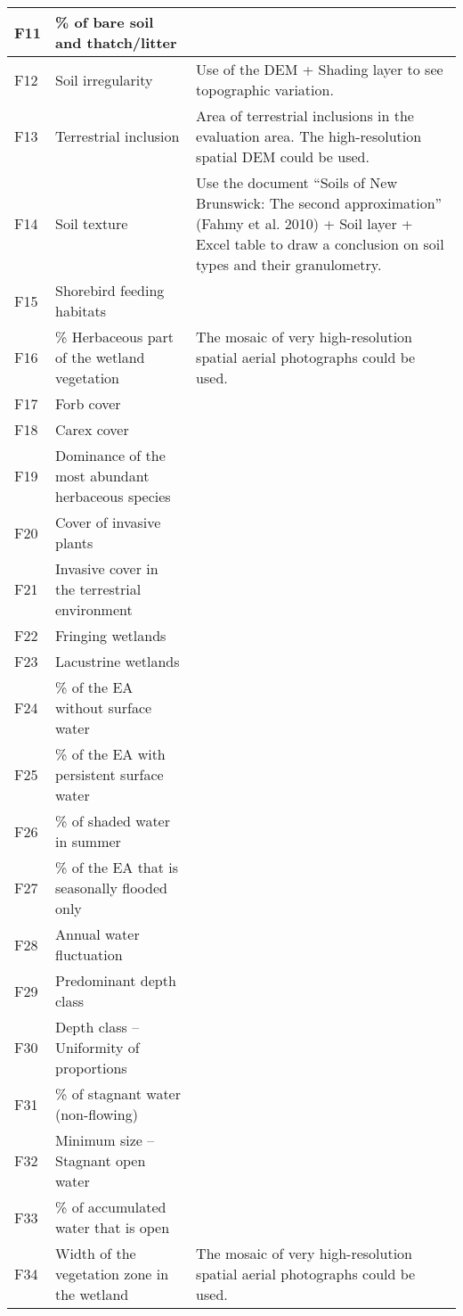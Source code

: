 \begin{longtable}{|l|p{3cm}|p{10cm}|}
    F11 & \% of bare soil and thatch/litter & \\ \hline
    F12 & Soil irregularity & Use of the DEM + Shading layer to see topographic variation. \\ \hline
    F13 & Terrestrial inclusion & Area of terrestrial inclusions in the evaluation area. The high-resolution spatial DEM could be used. \\ \hline
    F14 & Soil texture & Use the document “Soils of New Brunswick: The second approximation” (Fahmy et al. 2010) + Soil layer + Excel table to draw a conclusion on soil types and their granulometry. \\ \hline
    F15 & Shorebird feeding habitats & \\ \hline
    F16 & \% Herbaceous part of the wetland vegetation & The mosaic of very high-resolution spatial aerial photographs could be used. \\ \hline
    F17 & Forb cover & \\ \hline
    F18 & Carex cover & \\ \hline
    F19 & Dominance of the most abundant herbaceous species & \\ \hline
    F20 & Cover of invasive plants & \\ \hline
    F21 & Invasive cover in the terrestrial environment & \\ \hline
    F22 & Fringing wetlands & \\ \hline
    F23 & Lacustrine wetlands & \\ \hline
    F24 & \% of the EA without surface water & \\ \hline
    F25 & \% of the EA with persistent surface water & \\ \hline
    F26 & \% of shaded water in summer & \\ \hline
    F27 & \% of the EA that is seasonally flooded only & \\ \hline
    F28 & Annual water fluctuation & \\ \hline
    F29 & Predominant depth class & \\ \hline
    F30 & Depth class – Uniformity of proportions & \\ \hline
    F31 & \% of stagnant water (non-flowing) & \\ \hline
    F32 & Minimum size – Stagnant open water & \\ \hline
    F33 & \% of accumulated water that is open & \\ \hline
    F34 & Width of the vegetation zone in the wetland & The mosaic of very high-resolution spatial aerial photographs could be used. \\ \hline

\end{longtable}
